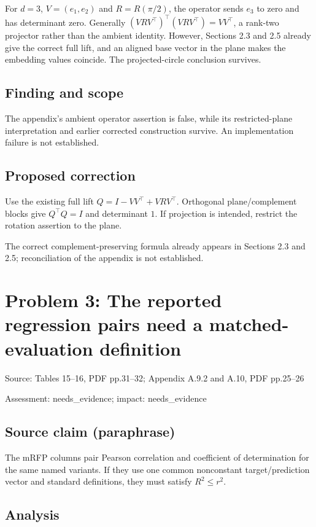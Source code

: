 \documentclass[11pt]{article}
\begin{document}
For \(d=3\), \(V=(e_1,e_2)\) and \(R=R(\pi/2)\), the operator sends \(e_3\) to zero and has determinant zero. Generally \((VRV^\top)^\top(VRV^\top)=VV^\top\), a rank-two projector rather than the ambient identity. However, Sections 2.3 and 2.5 already give the correct full lift, and an aligned base vector in the plane makes the embedding values coincide. The projected-circle conclusion survives.

\subsection*{Finding and scope}

The appendix’s ambient operator assertion is false, while its restricted-plane interpretation and earlier corrected construction survive. An implementation failure is not established.

\subsection*{Proposed correction}

Use the existing full lift \(Q=I-VV^\top+VRV^\top\). Orthogonal plane/complement blocks give \(Q^\top Q=I\) and determinant \(1\). If projection is intended, restrict the rotation assertion to the plane.

The correct complement-preserving formula already appears in Sections 2.3 and 2.5; reconciliation of the appendix is not established.

\section*{Problem 3: The reported regression pairs need a matched-evaluation definition}

Source: Tables 15–16, PDF pp.31–32; Appendix A.9.2 and A.10, PDF pp.25–26

Assessment: needs\_evidence; impact: needs\_evidence

\subsection*{Source claim (paraphrase)}

The mRFP columns pair Pearson correlation and coefficient of determination for the same named variants. If they use one common nonconstant target/prediction vector and standard definitions, they must satisfy \(R^2\le r^2\).

\subsection*{Analysis}
\end{document}
